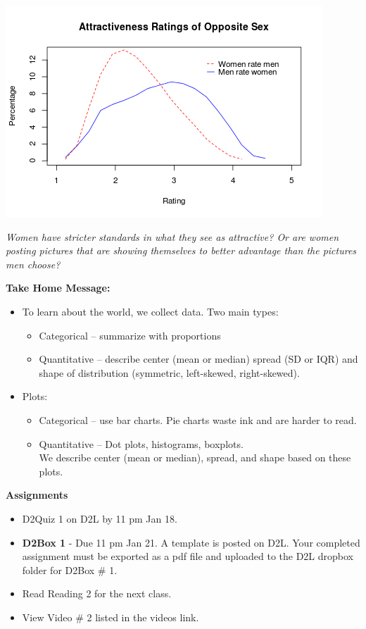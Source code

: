 \begin{enumerate}
 \includegraphics[width=.5\linewidth]{../plots/RateMenAndWomen.png}
\begin{students}
\vfill
\end{students}

\begin{key}
  {\it  Women have stricter standards in what they see as attractive?
     Or are women posting pictures that are showing themselves to
     better advantage than the pictures men choose?}
\end{key}
\end{enumerate}
  



\begin{center}
  {\bf Take Home Message:}
\end{center}
\begin{itemize}
\item To learn about the world, we collect data. Two main types:
  \begin{itemize}
  \item Categorical -- summarize with proportions
  \item Quantitative -- describe center (mean or median) spread (SD
    or IQR) and shape of distribution (symmetric, left-skewed,
    right-skewed). 
  \end{itemize}
\item Plots:
  \begin{itemize}
  \item Categorical -- use bar charts. Pie charts waste ink and are
    harder to read.
  \item Quantitative -- Dot plots, histograms, boxplots.\\
    We describe center (mean or median), spread, and shape based on
    these plots.
  \end{itemize}
\end{itemize} \vfill



{\bf Assignments}
\begin{itemize}
\item  D2Quiz 1 on D2L by 11 pm Jan 18.
\item {\bf D2Box 1} - Due 11 pm Jan 21.  A template is posted on D2L.
  Your completed assignment must be exported as a pdf file and uploaded
  to the D2L dropbox folder  for D2Box \# 1.
\item Read Reading 2 for the next class.
\item View Video \# 2 listed in the videos link. 
\end{itemize}

